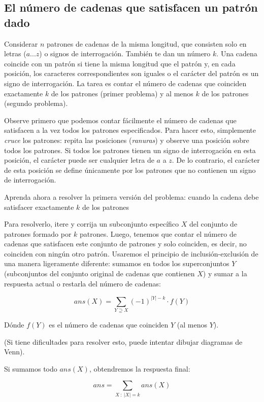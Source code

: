 \subsection{El número de cadenas que satisfacen un patrón dado}

Considerar $n$ patrones de cadenas de la misma longitud, que consisten solo en letras ($a...z$) o signos de interrogación. También te dan un número $k$. Una cadena coincide con un patrón si tiene la misma longitud que el patrón y, en cada posición, los caracteres correspondientes son iguales o el carácter del patrón es un signo de interrogación. La tarea es contar el número de cadenas que coinciden exactamente $k$ de los patrones (primer problema) y al menos $k$ de los patrones (segundo problema).

Observe primero que podemos contar fácilmente el número de cadenas que satisfacen a la vez todos los patrones especificados. Para hacer esto, simplemente \emph{cruce} los patrones: repita las posiciones (\emph{ranuras}) y observe una posición sobre todos los patrones. Si todos los patrones tienen un signo de interrogación en esta posición, el carácter puede ser cualquier letra de $a$ a $z$. De lo contrario, el carácter de esta posición se define únicamente por los patrones que no contienen un signo de interrogación.

Aprenda ahora a resolver la primera versión del problema: cuando la cadena debe satisfacer exactamente $k$ de los patrones

Para resolverlo, itere y corrija un subconjunto específico $X$ del conjunto de patrones formado por $k$ patrones. Luego, tenemos que contar el número de cadenas que satisfacen este conjunto de patrones y solo coinciden, es decir, no coinciden con ningún otro patrón. Usaremos el principio de inclusión-exclusión de una manera ligeramente diferente: sumamos en todos los superconjuntos $Y$ (subconjuntos del conjunto original de cadenas que contienen $X$) y sumar a la respuesta actual o restarla del número de cadenas:

$$ans(X) = \sum_{Y \supseteq X} (-1)^{|Y|-k} \cdot f(Y)$$

Dónde $f(Y)$ es el número de cadenas que coinciden $Y$ (al menos $Y$).

(Si tiene dificultades para resolver esto, puede intentar dibujar diagramas de Venn).

Si sumamos todo $ans(X)$, obtendremos la respuesta final:

$$ans = \sum_{X ~ : ~ |X| = k} ans(X)$$

